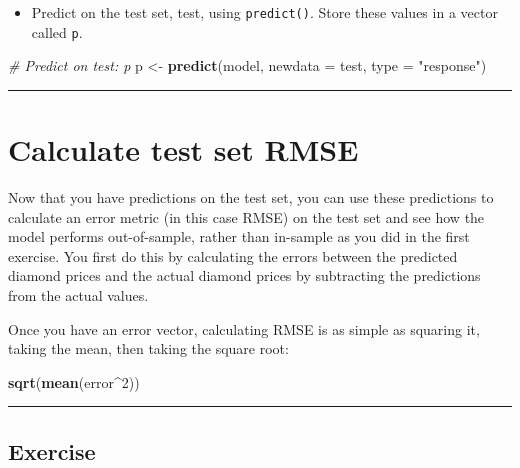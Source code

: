 \documentclass[]{book}
\newenvironment{Shaded}{\begin{snugshade}}{\end{snugshade}}
\newcommand{\KeywordTok}[1]{\textcolor[rgb]{0.13,0.29,0.53}{\textbf{#1}}}
\newcommand{\DataTypeTok}[1]{\textcolor[rgb]{0.13,0.29,0.53}{#1}}
\newcommand{\DecValTok}[1]{\textcolor[rgb]{0.00,0.00,0.81}{#1}}
\newcommand{\StringTok}[1]{\textcolor[rgb]{0.31,0.60,0.02}{#1}}
\newcommand{\CommentTok}[1]{\textcolor[rgb]{0.56,0.35,0.01}{\textit{#1}}}
\newcommand{\OperatorTok}[1]{\textcolor[rgb]{0.81,0.36,0.00}{\textbf{#1}}}
\newcommand{\NormalTok}[1]{#1}
\providecommand{\tightlist}{%
  \setlength{\itemsep}{0pt}\setlength{\parskip}{0pt}}
\begin{document}
\begin{itemize}
\tightlist
\item
  Predict on the test set, test, using \texttt{predict()}. Store these
  values in a vector called \texttt{p}.
\end{itemize}

\begin{Shaded}
\begin{Highlighting}[]
\CommentTok{# Predict on test: p}
\NormalTok{p <-}\StringTok{ }\KeywordTok{predict}\NormalTok{(model, }\DataTypeTok{newdata =}\NormalTok{ test, }\DataTypeTok{type =} \StringTok{"response"}\NormalTok{)}
\end{Highlighting}
\end{Shaded}

\begin{center}\rule{0.5\linewidth}{\linethickness}\end{center}

\section{Calculate test set RMSE}\label{calculate-test-set-rmse}

Now that you have predictions on the test set, you can use these
predictions to calculate an error metric (in this case RMSE) on the test
set and see how the model performs out-of-sample, rather than in-sample
as you did in the first exercise. You first do this by calculating the
errors between the predicted diamond prices and the actual diamond
prices by subtracting the predictions from the actual values.

Once you have an error vector, calculating RMSE is as simple as squaring
it, taking the mean, then taking the square root:

\begin{Shaded}
\begin{Highlighting}[]
\KeywordTok{sqrt}\NormalTok{(}\KeywordTok{mean}\NormalTok{(error}\OperatorTok{^}\DecValTok{2}\NormalTok{))}
\end{Highlighting}
\end{Shaded}

\begin{center}\rule{0.5\linewidth}{\linethickness}\end{center}

\subsection*{Exercise}\label{exercise-4}
\end{document}
